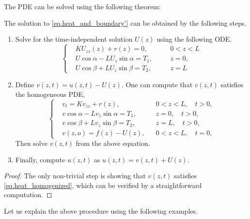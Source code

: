 The PDE can be solved using the following theorem:
\begin{theorem}
    The solution to \eqref{eq.heat_and_boundary'} can be obtained by the following steps.
    \begin{enumerate}
        \item Solve for the time-independent solution $U(z)$ using the following ODE.
        \begin{equation}
        \left\{\begin{aligned} 
            &K U_{z z}(z) + r(z) = 0, && 0<z<L
            \\ 
            &U \cos \alpha-L U_z \sin \alpha=T_1,\quad && z=0, 
            \\ 
            &U \cos \beta+L U_z \sin \beta=T_2, && z=L
        \end{aligned}\right.
    \end{equation}
    \item Define $v(z, t) = u(z, t) - U(z)$. One can compute that $v(z, t)$ satisfies the homogeneous PDE,
    \begin{equation}\label{eq.heat_homogenized}
        \left\{\begin{aligned} 
            &v_t=K v_{z z} + r(z), && 0<z<L, \quad t>0, 
            \\ 
            &v \cos \alpha-L v_z \sin \alpha=T_1,\quad && z=0, \quad t>0, 
            \\ 
            &v \cos \beta+L v_z \sin \beta=T_2, && z=L, \quad t>0, 
            \\
            &v(z, o)=f(z)-U(z), && 0<z<L, \quad t=0,
        \end{aligned}\right.
    \end{equation}
    Then solve $v(z, t)$ from the above equation.
    \item Finally, compute $u(z, t)$ as $u(z, t) = v(z, t) + U(z)$.
    \end{enumerate}
\end{theorem}
\begin{proof}
    The only non-trivial step is showing that $v(z, t)$ satisfies \eqref{eq.heat_homogenized}, which can be verified by a straightforward computation.
\end{proof}

Let us explain the above procedure using the following examples.

